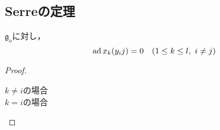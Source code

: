 \documentclass[rep_main]{subfiles}
\begin{document}
\subsection{Serreの定理}

\begin{mylem}[label=lem:Serre]{}
	$\mathfrak{g}_o$に対し，
	\begin{equation}
		\ad x_k(y_ij) = 0\quad  (1 \leq k \leq l,\ i \neq j)
	\end{equation}
\end{mylem}
\begin{proof}
	\begin{description}
	\item[$k \neq i$の場合]
	\item[$k = i$の場合]
	\end{description}
\end{proof}
\end{document}
